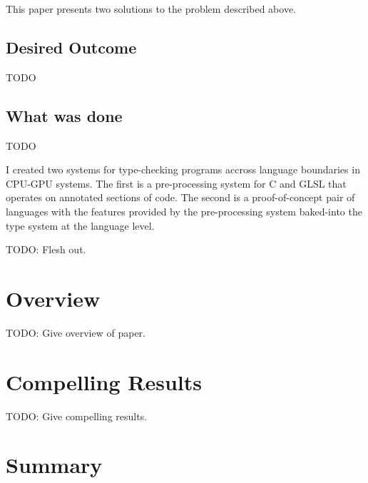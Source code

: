 \documentclass[a4paper,12pt,twoside,openright]{report}
\begin{document}
This paper presents two solutions to the problem described above.

\subsection{Desired Outcome}

TODO


\subsection{What was done}

TODO

I created two systems for type-checking programs accross language boundaries in
CPU-GPU systems. The first is a pre-processing system for C and GLSL that
operates on annotated sections of code. The second is a proof-of-concept pair
of languages with the features provided by the pre-processing system baked-into
the type system at the language level.


TODO: Flesh out.


\section{Overview}




TODO: Give overview of paper.

\section{Compelling Results}

TODO: Give compelling results.

\section{Summary}
\end{document}
